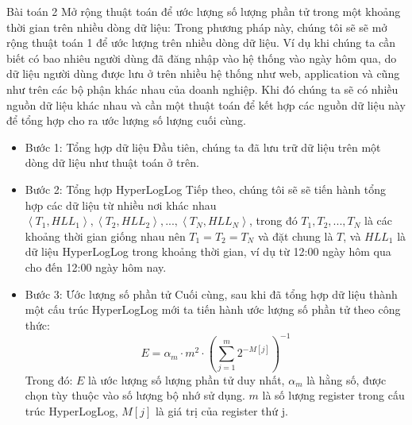 \documentclass[10pt]{beamer}
\begin{document}
\begin{frame}[fragile]{Bài toán 2}
  Mở rộng thuật toán để ước lượng số lượng phần tử trong một khoảng thời gian trên nhiều dòng dữ liệu:
  Trong phương pháp này, chúng tôi sẽ sẽ mở rộng thuật toán 1 để ước lượng trên nhiều dòng dữ liệu. Ví dụ khi chúng ta cần biết có bao nhiêu người dùng
  đã đăng nhập vào hệ thống vào ngày hôm qua, do dữ liệu người dùng được lưu ở trên nhiều hệ thống như web, application và cũng như trên các bộ phận khác nhau
  của doanh nghiệp. Khi đó chúng ta sẽ có nhiều nguồn dữ liệu khác nhau và cần một thuật toán để kết hợp các nguồn dữ liệu này để tổng hợp cho ra ước lượng
  số lượng cuối cùng.
  \begin{itemize}
      \item Bước 1: Tổng hợp dữ liệu
      Đầu tiên, chúng ta đã lưu trữ dữ liệu trên một dòng dữ liệu như thuật toán ở trên. 
      \item Bước 2: Tổng hợp HyperLogLog
      Tiếp theo, chúng tôi sẽ sẽ tiến hành tổng hợp các dữ liệu từ nhiều nơi khác nhau $\left< T_1, HLL_1\right>, \left< T_2, HLL_2\right>,...,\left< T_N, HLL_N\right>$, 
      trong đó $T_1, T_2,...,T_N$ là các khoảng thời gian giống nhau nên $T_1 = T_2 = T_N$ và đặt chung là $T$, và $HLL_1$ là dữ liệu HyperLogLog trong khoảng thời gian, ví dụ
      từ 12:00 ngày hôm qua cho đến 12:00 ngày hôm nay.  
      \item Bước 3: Ước lượng số phần tử
      Cuối cùng, sau khi đã tổng hợp dữ liệu thành một cấu trúc HyperLogLog mới ta tiến hành ước lượng số phần tử theo công thức:
      \[E = \alpha_m \cdot m^2 \cdot \left( \sum_{j=1}^{m} 2^{-M[j]} \right)^{-1}\]
      Trong đó: $E$ là ước lượng số lượng phần tử duy nhất, 
      $\alpha_m$ là hằng số, được chọn tùy thuộc vào số lượng bộ nhớ sử dụng.
      $m$ là số lượng register trong cấu trúc HyperLogLog, $M[j]$ là giá trị của register thứ j.
\end{itemize}
\end{frame}
\end{document}
